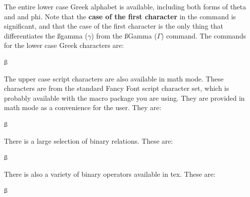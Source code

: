 The entire lower case Greek alphabet is available, including both
forms of theta and and phi. Note that the {\bf case of the first
character} in the command is significant, and that the case of
the first character is the only thing that differentiates the
{\ss gamma ($\gamma$)} from the {\ss Gamma ($\Gamma$)} command.
The commands for the lower case Greek characters are:{
\ss{}

		
	
		
		
				
		
	
		
}

The upper case script characters are also available in math mode.
These characters are from the standard {\FF Fancy Font} script
character set, which is probably available with the macro package
you are using. They are provided in math mode as a convenience
for the user. They are:{\ss{}

		
		
		
		
		
		
		
		
	}

There is a large selection of binary relations. These are:{\ss{}

		
		
		
			
			
		
	}

There is also a variety of binary operators available in tex. These
are:{\ss{}

				
		
		
		
	}

